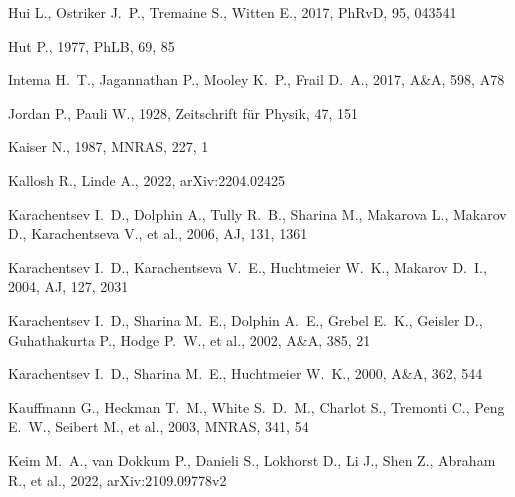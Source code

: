 \documentclass[fleqn,12pt]{article}
\begin{document}
\begin{thebibliography}{}
 Hui L., Ostriker J.~P., Tremaine S., Witten E., 2017, PhRvD, 95, 043541

 Hut P., 1977, PhLB, 69, 85


 Intema H.~T., Jagannathan P., Mooley K.~P., Frail D.~A., 2017, A\&A, 598, A78

 Jordan P., Pauli W., 1928, Zeitschrift für Physik, 47, 151

 Kaiser N., 1987, MNRAS, 227, 1

 Kallosh R., Linde A., 2022, arXiv:2204.02425


 Karachentsev I.~D., Dolphin A., Tully R.~B., Sharina M., Makarova L., Makarov D., Karachentseva V., et al., 2006, AJ, 131, 1361

 Karachentsev I.~D., Karachentseva V.~E., Huchtmeier W.~K., Makarov D.~I., 2004, AJ, 127, 2031

 Karachentsev I.~D., Sharina M.~E., Dolphin A.~E., Grebel E.~K., Geisler D., Guhathakurta P., Hodge P.~W., et al., 2002, A\&A, 385, 21

 Karachentsev I.~D., Sharina M.~E., Huchtmeier W.~K., 2000, A\&A, 362, 544

 Kauffmann G., Heckman T.~M., White S.~D.~M., Charlot S., Tremonti C., Peng E.~W., Seibert M., et al., 2003, MNRAS, 341, 54

 Keim M.~A., van Dokkum P., Danieli S., Lokhorst D., Li J., Shen Z., Abraham R., et al., 2022,  arXiv:2109.09778v2 


\end{thebibliography}
\end{document}
